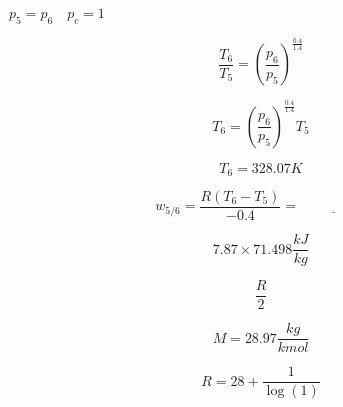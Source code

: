 

\item[(a)] $p_5 = p_6 \quad p_c = 1$
    
    \[
    \frac{T_6}{T_5} = \left( \frac{p_6}{p_5} \right)^{\frac{0.4}{1.4}}
    \]
    
    \[
    T_6 = \left( \frac{p_6}{p_5} \right)^{\frac{0.4}{1.4}} T_5
    \]
    
    \[
    T_6 = 328.07 K
    \]
    
    \[
    w_{5/6} = \frac{R \left( T_6 - T_5 \right)}{-0.4} = \underline{\hspace{2cm}}
    \]
    
    \[
    7.87 \times 71.498 \frac{kJ}{kg}
    \]
    
    \[
    \frac{R}{2}
    \]
    
    \[
    M = 28.97 \frac{kg}{kmol}
    \]
    
    \[
    R = 28 + \frac{1}{\log(1)}
    \]